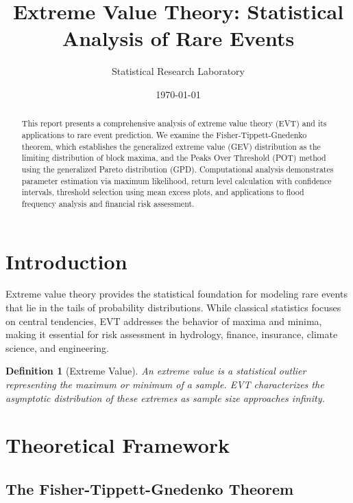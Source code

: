 \documentclass[a4paper, 11pt]{article}
\title{Extreme Value Theory: Statistical Analysis of Rare Events}
\author{Statistical Research Laboratory}
\date{\today}
\newtheorem{definition}{Definition}[section]
\begin{document}
\maketitle

\begin{abstract}
This report presents a comprehensive analysis of extreme value theory (EVT) and its applications
to rare event prediction. We examine the Fisher-Tippett-Gnedenko theorem, which establishes
the generalized extreme value (GEV) distribution as the limiting distribution of block maxima,
and the Peaks Over Threshold (POT) method using the generalized Pareto distribution (GPD).
Computational analysis demonstrates parameter estimation via maximum likelihood, return level
calculation with confidence intervals, threshold selection using mean excess plots, and
applications to flood frequency analysis and financial risk assessment.
\end{abstract}

\section{Introduction}

Extreme value theory provides the statistical foundation for modeling rare events that lie
in the tails of probability distributions. While classical statistics focuses on central
tendencies, EVT addresses the behavior of maxima and minima, making it essential for risk
assessment in hydrology, finance, insurance, climate science, and engineering.

\begin{definition}[Extreme Value]
An extreme value is a statistical outlier representing the maximum or minimum of a sample.
EVT characterizes the asymptotic distribution of these extremes as sample size approaches infinity.
\end{definition}

\section{Theoretical Framework}

\subsection{The Fisher-Tippett-Gnedenko Theorem}
\end{document}
